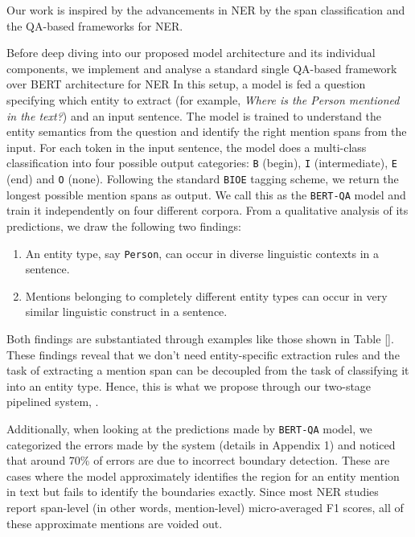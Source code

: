 Our work is inspired by the advancements in NER by the span classification and the QA-based frameworks for NER.

Before deep diving into our proposed model architecture and its individual components, we implement and analyse a standard single QA-based framework over BERT architecture for NER%
In this setup, a model is fed a question specifying which entity to extract (for example, \textit{Where is the Person mentioned in the text?}) and an input sentence. The model is trained to understand the entity semantics from the question and identify the right mention spans from the input. 
For each token in the input sentence, the model does a multi-class classification into four possible output categories: \texttt{B} (begin), \texttt{I} (intermediate), \texttt{E} (end) and \texttt{O} (none). Following the standard \texttt{BIOE} tagging scheme, we return the longest possible mention spans as output. We call this as the \texttt{BERT-QA} model and train it independently on four different corpora. %
From a qualitative analysis of its predictions, we draw the following two findings:
\begin{enumerate}
    \item An entity type, say \texttt{Person}, can occur in diverse linguistic contexts in a sentence.
    
    \item Mentions belonging to completely different entity types can occur in very similar linguistic construct in a sentence.
\end{enumerate}

Both findings are substantiated through examples like those shown in Table \ref{}. 
These findings reveal that we don't need entity-specific extraction rules and the task of extracting a mention span can be decoupled from the task of classifying it into an entity type. 
Hence, this is what we propose through our two-stage pipelined system, \modelname.

Additionally, when looking at the predictions made by \texttt{BERT-QA} model, we categorized the errors made by the system (details in Appendix 1)  and noticed that around 70\%  of errors are due to incorrect boundary detection. These are cases where the model approximately identifies the region for an entity mention in text but fails to identify the boundaries exactly. Since most NER studies report span-level (in other words, mention-level) micro-averaged F1 scores, all of these approximate mentions are voided out. 

